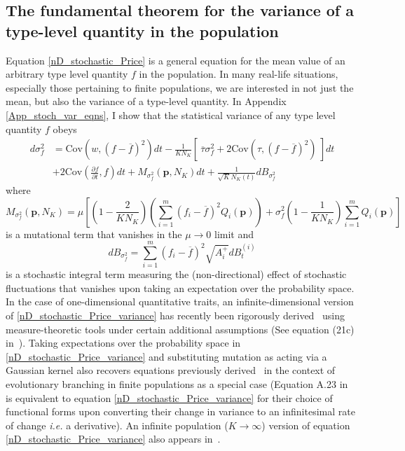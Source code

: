 \subsection{The fundamental theorem for the variance of a type-level quantity in the population}\label{sec_fun_theorems_var}
Equation \eqref{nD_stochastic_Price} is a general equation for the mean value of an arbitrary type level quantity $f$ in the population. In many real-life situations, especially those pertaining to finite populations, we are interested in not just the mean, but also the variance of a type-level quantity. In Appendix \ref{App_stoch_var_eqns}, I show that the statistical variance of any type level quantity $f$ obeys
\begin{equation}
\label{nD_stochastic_Price_variance}
\begin{aligned}
d\sigma^2_{f} &= \textrm{Cov}\left(w,(f - \overline{f})^2\right)dt - \frac{1}{KN_K}\left[ \ \overline{\tau}\sigma^2_{f} +  2\textrm{Cov}\left(\tau,(f - \overline{f})^2\right) \ \right]dt\\[12pt]
& + 2\textrm{Cov}\left(\frac{\partial f}{\partial t},f\right)dt + M_{\sigma^2_f}(\mathbf{p},N_K)dt + \frac{1}{\sqrt{K}N_{K}(t)}dB_{\sigma^2_{f}}
\end{aligned}
\end{equation}
where
\begin{equation}
\label{variance_price_mutation_term}
M_{\sigma^2_f}(\mathbf{p},N_K) = \mu\left[\left(1 - \frac{2}{KN_K}\right)\left(\sum\limits_{i=1}^{m}(f_i - \overline{f})^2Q_i(\mathbf{p})\right) + \sigma^2_f\left(1 - \frac{1}{KN_K}\right)\sum\limits_{i=1}^{m}Q_i(\mathbf{p})\right]
\end{equation}
is a mutational term that vanishes in the $\mu \to 0$ limit and
\begin{equation}
\label{variance_price_diffusion_term}
dB_{\sigma^2_f} = \sum\limits_{i=1}^{m}\left(f_i - \overline{f}\right)^2\sqrt{A_i^+}dB_{t}^{(i)}
\end{equation}
is a stochastic integral term measuring the (non-directional) effect of stochastic fluctuations that vanishes upon taking an expectation over the probability space. In the case of one-dimensional quantitative traits, an infinite-dimensional version of \eqref{nD_stochastic_Price_variance} has recently been rigorously derived~\citep{week_white_2021} using measure-theoretic tools under certain additional assumptions (See equation (21c) in~\cite{week_white_2021}). Taking expectations over the probability space in \eqref{nD_stochastic_Price_variance} and substituting mutation as acting via a Gaussian kernel also recovers equations previously derived~\citep{debarre_evolutionary_2016} in the context of evolutionary branching in finite populations as a special case (Equation A.23 in~\cite{debarre_evolutionary_2016} is equivalent to equation \eqref{nD_stochastic_Price_variance} for their choice of functional forms upon converting their change in variance to an infinitesimal rate of change \emph{i.e.} a derivative). An infinite population ($K \to \infty$) version of equation \eqref{nD_stochastic_Price_variance} also appears in~\cite{lion_theoretical_2018}.

